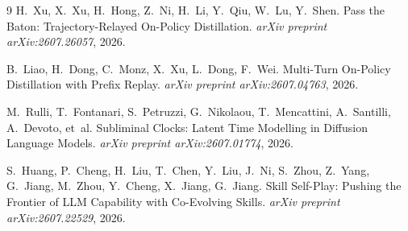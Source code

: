 \documentclass[11pt,a4paper]{article}
\begin{document}

\begin{thebibliography}{9}
H.~Xu, X.~Xu, H.~Hong, Z.~Ni, H.~Li, Y.~Qiu, W.~Lu, Y.~Shen.
\newblock Pass the Baton: Trajectory-Relayed On-Policy Distillation.
\newblock \emph{arXiv preprint arXiv:2607.26057}, 2026.

B.~Liao, H.~Dong, C.~Monz, X.~Xu, L.~Dong, F.~Wei.
\newblock Multi-Turn On-Policy Distillation with Prefix Replay.
\newblock \emph{arXiv preprint arXiv:2607.04763}, 2026.

M.~Rulli, T.~Fontanari, S.~Petruzzi, G.~Nikolaou, T.~Mencattini, A.~Santilli, A.~Devoto, et~al.
\newblock Subliminal Clocks: Latent Time Modelling in Diffusion Language Models.
\newblock \emph{arXiv preprint arXiv:2607.01774}, 2026.

S.~Huang, P.~Cheng, H.~Liu, T.~Chen, Y.~Liu, J.~Ni, S.~Zhou, Z.~Yang, G.~Jiang, M.~Zhou, Y.~Cheng, X.~Jiang, G.~Jiang.
\newblock Skill Self-Play: Pushing the Frontier of LLM Capability with Co-Evolving Skills.
\newblock \emph{arXiv preprint arXiv:2607.22529}, 2026.
\end{thebibliography}
\end{document}
